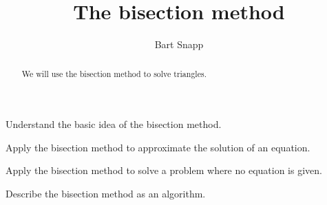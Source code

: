 \documentclass{ximera}
\title{The bisection method}
\author{Bart Snapp}
\begin{document}
\begin{abstract}
  We will use the bisection method to solve triangles.
\end{abstract}
\maketitle

\begin{listOutcomes}
\item{Understand the basic idea of the bisection method.}
\item{Apply the bisection method to approximate the solution of an equation.}
\item{Apply the bisection method to solve a problem where no equation is given.}
\item{Describe the bisection method as an algorithm.}
\end{listOutcomes}
\mynewpage
\end{document}
